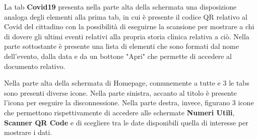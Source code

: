 \documentclass[12pt,a4paper,twoside,openright,titlepage]{book}
\begin{document}
La tab \textbf{Covid19} presenta nella parte alta della schermata una disposizione analoga degli elementi alla prima tab, in cui è presente il codice QR relativo al Covid del cittadino con la possibilità di eseguirne la scansione per mostrare a chi di dovere gli ultimi eventi relativi alla propria storia clinica relativa a ciò. Nella parte sottostante è presente una lista di elementi che sono formati dal nome dell'evento, dalla data e da un bottone "Apri" che permette di accedere al documento relativo.\newline

Nella parte alta della schermata di Homepage, comunemente a tutte e 3 le tabs sono presenti diverse icone. Nella parte sinistra, accanto al titolo è presente l'icona per eseguire la disconnessione. Nella parte destra, invece, figurano 3 icone che permettono rispettivamente di accedere alle schermate \textbf{Numeri Utili}, \textbf{Scanner QR Code} e di scegliere tra le date disponibili quella di interesse per mostrare i dati.
\end{document}

